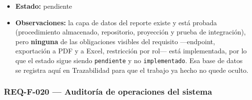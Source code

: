 \documentclass[
  spanish,
]{article}
\begin{document}
\begin{itemize}
  catálogo \texttt{docs/\allowbreak{}basedatos/\allowbreak{}CATALOGO-\allowbreak{}SP.\allowbreak{}md} (categoría ``3)
  Reporte''). Sin controlador, servicio de exportación ni endpoint en el
  repositorio actual.
\item
  \textbf{Estado:} pendiente
\item
  \textbf{Observaciones:} la capa de datos del reporte existe y está
  probada (procedimiento almacenado, repositorio, proyección y prueba de
  integración), pero \textbf{ninguna} de las obligaciones visibles del
  requisito ---endpoint, exportación a PDF y a Excel, restricción por
  rol--- está implementada, por lo que el estado sigue siendo
  \texttt{pendiente} y no \texttt{implementado}. Esa base de datos se
  registra aquí en Trazabilidad para que el trabajo ya hecho no quede
  oculto.
\end{itemize}

\subsubsection{REQ-F-020 --- Auditoría de operaciones del
sistema}\label{req-f-020-auditoruxeda-de-operaciones-del-sistema}
\end{document}
